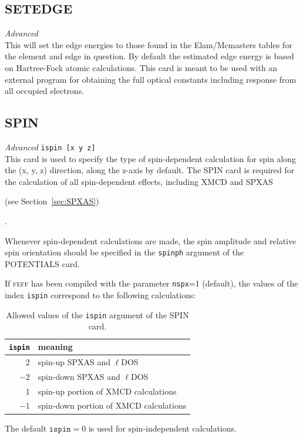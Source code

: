 \documentclass[11pt,oneside]{report} %
\renewcommand{\htmlref}[2]{\hyperlink{#2}{#1}}
\newcommand{\program}[1]{\textsc{#1}}
\newcommand{\feff}{\program{feff}}
\newenvironment{Card}[4]%
      {\vspace{3ex}%
        \subsection{#1}
        \quad\textsl{#3}\newline
        \quad\texttt{#2}\newline%
        \label{card:#4}\\}
      {}
\renewcommand{\htmlref}[2]{{#1}} %
\begin{document}
\begin{Card}{SETEDGE}{}{Advanced}{set}
  This will set the edge energies to those found in the Elam/Mcmasters
  tables for the element and edge in question. By default the
  estimated edge energy is based on Hartree-Fock atomic
  calculations. This card is meant to be used with an
  external program for obtaining the full optical constants including
  response from all occupied electrons. 
\end{Card}



\begin{Card}{SPIN}{ispin [x  y  z] }{Advanced}{spi}
 This card is used to specify the type of spin-dependent calculation 
 for spin along the (x, y, z) direction, along the z-axis by default. 
 The SPIN card is required for the calculation of all spin-dependent effects, 
 including \htmlref{XMCD}{card:xnc} and SPXAS
 \begin{latexonly}
   (see Section~\ref{sec:SPXAS}) 
 \end{latexonly}. 

  Whenever spin-dependent calculations are made, the spin amplitude and 
 relative spin orientation should be specified in the \texttt{spinph} argument
 of the \htmlref{POTENTIALS}{card:pot} card.
 
 If {\feff} has been compiled with the parameter \texttt{nspx}=1 (default), 
 the values of the index \texttt{ispin} correspond to the following calculations:
\begin{table}[htbp]
  \begin{center}
    \begin{tabular}[h]{rl}
      \hline\hline
      \texttt{ispin} & \quad meaning \\
      \hline
      2    & spin-up SPXAS and $\ell$DOS\\
      $-2$ & spin-down SPXAS and $\ell$DOS\\
      1    & spin-up portion of XMCD calculations \\
      $-1$ & spin-down portion of XMCD calculations \\
      \hline\hline
    \end{tabular}
    \caption{Allowed values of the \texttt{ispin} argument of the SPIN card.}
    \label{tab:spin}
  \end{center}
\end{table}

  The default $\mathtt{ispin}=0$ is used for spin-independent calculations.


\end{Card}
\end{document}
